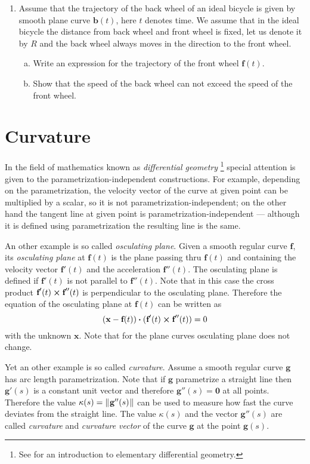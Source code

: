 \begin{enumerate}[\bfseries 1.]
  \item Assume that the trajectory of the back wheel of an ideal bicycle is given by smooth plane curve $\textbf{b}(t)$, here $t$ denotes time. 
  We assume that in the ideal bicycle the distance from back wheel and front wheel is fixed, let us denote it by $R$ and the back wheel always moves in the direction to the front wheel.
  
  \begin{enumerate}[(a)]
  \item Write an expression for the trajectory of the front wheel $\textbf{f}(t)$. 
  \item Show that the speed of the back wheel can not exceed the speed of the front wheel.
  \end{enumerate}
\end{enumerate}

\newpage
\section{Curvature}

In the field of mathematics known as \emph{differential
geometry}%
\footnote{See \cite{one} for an introduction to elementary differential geometry.} 
 special attention is given to the parametrization-independent constructions.
For example, depending on the parametrization, the velocity vector of the curve at given point can be multiplied by a scalar, so it is not parametrization-independent;
on the other hand the tangent line at given point is parametrization-independent --- although it is defined using parametrization the resulting line is the same.

An other example is so called \emph{osculating plane}.
Given a smooth regular curve $\textbf{f}$,
its \emph{osculating plane} at $\textbf{f}(t)$
is the plane passing thru $\textbf{f}(t)$ and containing the velocity vector $\textbf{f}'(t)$ and the acceleration $\textbf{f}''(t)$.
The osculating plane is defined if $\textbf{f}'(t)$ is not parallel to $\textbf{f}''(t)$.
Note that in this case the cross product $\textbf{f}'(t) \bm{\times} \textbf{f}''(t)$ is perpendicular to the osculating plane.
Therefore the equation of the osculating plane at $\textbf{f}(t)$ can be written as
\[(\textbf{x}-\textbf{f}(t)) \bm{\cdot} (\textbf{f}'(t) \bm{\times} \textbf{f}''(t))=0\]
with the unknown $\textbf{x}$.
Note that for the plane curves osculating plane does not change.

Yet an other example is so called \emph{curvature}. 
Assume a smooth regular curve $\textbf{g}$ has arc length parametrization.
Note that if $\textbf{g}$ para\-met\-rize a straight line 
then $\textbf{g}'(s)$ is a constant unit vector and therefore $\textbf{g}''(s)=\textbf{0}$ at all points.
Therefore the value $\kappa(s)=\lVert\mspace{1mu}\textbf{g}''(s)\mspace{1mu}\rVert$ can be used to measure how fast the curve deviates from the straight line.
The value $\kappa(s)$ and the vector $\textbf{g}''(s)$ are called \emph{curvature} and \emph{curvature vector} of the curve $\textbf{g}$ at the point $\textbf{g}(s)$.

